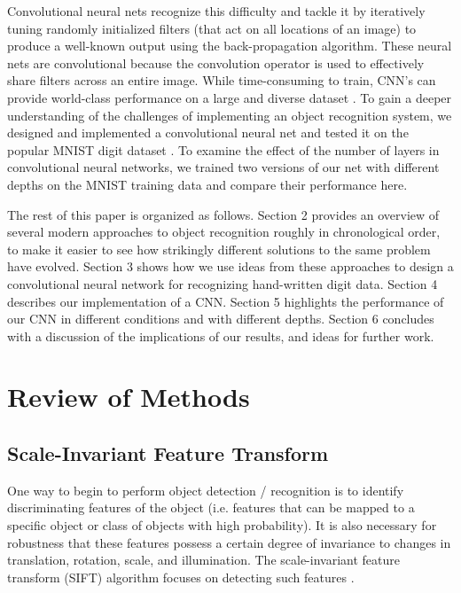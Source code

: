 \documentclass[10pt,twocolumn,letterpaper]{article}
\begin{document}
Convolutional neural nets recognize this difficulty and tackle it by iteratively tuning randomly
initialized filters (that act on all locations of an image) to produce a well-known output using
the back-propagation algorithm. These neural nets are convolutional because the convolution operator
is used to effectively share filters across an entire image. While time-consuming to train, CNN's
can provide world-class performance on a large and diverse dataset \cite{ImageNet}.
To gain a deeper understanding of the challenges of implementing an object recognition system,
we designed and implemented a convolutional neural net and tested it on the popular MNIST
digit dataset \cite{MNIST}.
To examine the effect of the number of layers in convolutional neural networks,
we trained two versions of our net with different depths on the MNIST training data
and compare their performance here.

The rest of this paper is organized as follows.
Section 2 provides an overview of several modern approaches to object recognition
roughly in chronological order, to make it easier to see how strikingly different
solutions to the same problem have evolved.
Section 3 shows how we use ideas from these approaches to design
a convolutional neural network for recognizing hand-written digit data.
Section 4 describes our implementation of a CNN.
Section 5 highlights the performance of our CNN in different conditions and with different depths.
Section 6 concludes with a discussion of the implications of our results, and ideas for
further work.

\section{Review of Methods}
\subsection{Scale-Invariant Feature Transform}

One way to begin to perform object detection / recognition is to identify discriminating
features of the object (i.e. features that can be mapped to a specific object or class of
objects with high probability). It is also necessary for robustness that these features
possess a certain degree of invariance to changes in translation, rotation, scale, and
illumination. The scale-invariant feature transform (SIFT) algorithm focuses on detecting
such features \cite{LoweObjSIFT}.
\end{document}

